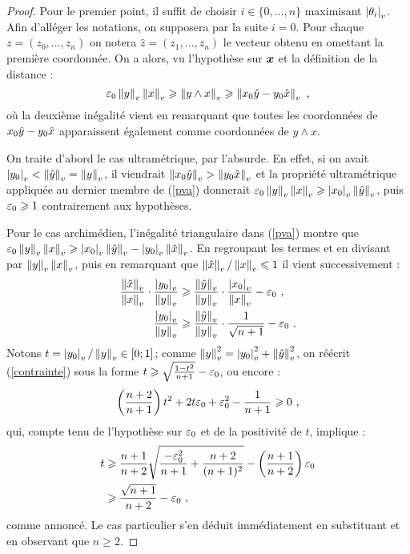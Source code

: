 \documentclass[11pt, twoside, a4paper]{article}
\theoremstyle{remark}
\begin{document}
\begin{proof}
 Pour le premier point, il suffit de choisir $i \in \{ 0, \dots, n\}$ maximisant $\av{\coa_i}$. Afin d'alléger les notations, on supposera par la suite $i = 0$. Pour chaque $z = (z_0, \dots, z_n)$ on notera $\hat{z} = (z_1, \dots, z_n)$ le vecteur obtenu en omettant la première coordonnée. On a alors, vu l'hypothèse sur $\p x$ et la définition de la distance :
 \begin{equation}
  \eps_0 \nv y \nv x  \ge \nv{y \wedge x} \ge \nv{x_0 \hatys - y_0 \hatxs} \pmm{,} \label{pva}
 \end{equation}
 où la deuxième inégalité vient en remarquant que toutes les coordonnées de $x_0 \hatys - y_0 \hatxs$ apparaissent également comme coordonnées de $y \wedge x$.

 On traite d'abord le cas ultramétrique, par l'absurde. En effet, si on avait $\av{y_0}< \nv{\hatys} = \nv{y}$, il viendrait $\nv{x_0 \hatys} > \nv{y_0 \hatxs}$ et la propriété ultramétrique appliquée au dernier membre de (\ref{pva}) donnerait $\eps_0 \nv{y}\nv{x}  \ge \av{x_0}\nv{\hatys}$, puis $\eps_0 \ge 1$ contrairement aux hypothèses.

 Pour le cas archimédien, l'inégalité triangulaire dans (\ref{pva}) montre que $\eps_0 \nv{y}\nv{x}  \ge \av{x_0}\nv{\hatys} - \av{y_0}\nv{\hatxs} $. En regroupant les termes et en divisant par $\nv{y}\nv{x}$, puis en remarquant que $\nv{\hatxs}/\nv{x} \le 1$ il vient successivement :
 \begin{align}
  \frac{\nv{\hatxs}}{\nv{x}} \cdot \frac{\av{y_0}}{\nv{y}}
          & \ge \frac{\nv{\hatys}}{\nv{y}}\cdot \frac{\av{x_0}}{\nv{x}} - \eps_0 \pmm{,} \notag \\
  \frac{\av{y_0}}{\nv{y}} & \ge \frac{\nv{\hatys}}{\nv{y}}\cdot\frac{1}{\sqrt{n+1}} - \eps_0 \pmm. \label{contrainte}
 \end{align}
 Notons $t = \av{y_0}/\nv{y} \in [0; 1]$; comme $\nv{y}^2 = \av{y_0}^2 + \nv{\hatys}^2$, on réécrit (\ref{contrainte}) sous la forme $t \ge \sqrt{\frac{1-t^2}{n+1}}-\eps_0$, ou encore :
 \[
  \left(\frac{n+2}{n+1}\right)t^2 + 2t\eps_0 + \eps_0^2 - \frac{1}{n+1} \ge 0 \pmm,
 \]
 qui, compte tenu de l'hypothèse sur $\eps_0$ et de la positivité de $t$, implique :
 \begin{align*}
  t & \ge \frac{n+1}{n+2}\sqrt{\frac{-\eps_0^2}{n+1}+\frac{n+2}{(n+1)^2}} - \left(\frac{n+1}{n+2}\right)\eps_0\\
  & \ge \frac{\sqrt{n+1}}{n+2} - \eps_0 \pmm,
 \end{align*}
 comme annoncé. Le cas particulier s'en déduit immédiatement en substituant et en observant que $n \ge 2$.
\end{proof}
\end{document}
